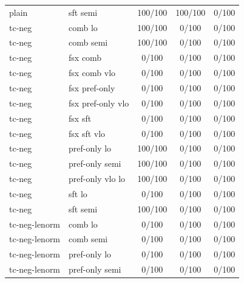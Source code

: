 \documentclass[10pt,landscape]{article}
\begin{document}
\begin{tabular}{llccc}
plain & sft semi & \cellcolor{done}100/100 & \cellcolor{done}100/100 & \cellcolor{missing}0/100 \\
tc-neg & comb lo & \cellcolor{done}100/100 & \cellcolor{missing}0/100 & \cellcolor{missing}0/100 \\
tc-neg & comb semi & \cellcolor{done}100/100 & \cellcolor{missing}0/100 & \cellcolor{missing}0/100 \\
tc-neg & fsx comb & \cellcolor{missing}0/100 & \cellcolor{missing}0/100 & \cellcolor{missing}0/100 \\
tc-neg & fsx comb vlo & \cellcolor{missing}0/100 & \cellcolor{missing}0/100 & \cellcolor{missing}0/100 \\
tc-neg & fsx pref-only & \cellcolor{missing}0/100 & \cellcolor{missing}0/100 & \cellcolor{missing}0/100 \\
tc-neg & fsx pref-only vlo & \cellcolor{missing}0/100 & \cellcolor{missing}0/100 & \cellcolor{missing}0/100 \\
tc-neg & fsx sft & \cellcolor{missing}0/100 & \cellcolor{missing}0/100 & \cellcolor{missing}0/100 \\
tc-neg & fsx sft vlo & \cellcolor{missing}0/100 & \cellcolor{missing}0/100 & \cellcolor{missing}0/100 \\
tc-neg & pref-only lo & \cellcolor{done}100/100 & \cellcolor{missing}0/100 & \cellcolor{missing}0/100 \\
tc-neg & pref-only semi & \cellcolor{done}100/100 & \cellcolor{missing}0/100 & \cellcolor{missing}0/100 \\
tc-neg & pref-only vlo lo & \cellcolor{done}100/100 & \cellcolor{missing}0/100 & \cellcolor{missing}0/100 \\
tc-neg & sft lo & \cellcolor{missing}0/100 & \cellcolor{missing}0/100 & \cellcolor{missing}0/100 \\
tc-neg & sft semi & \cellcolor{done}100/100 & \cellcolor{missing}0/100 & \cellcolor{missing}0/100 \\
tc-neg-lenorm & comb lo & \cellcolor{missing}0/100 & \cellcolor{missing}0/100 & \cellcolor{missing}0/100 \\
tc-neg-lenorm & comb semi & \cellcolor{missing}0/100 & \cellcolor{missing}0/100 & \cellcolor{missing}0/100 \\
tc-neg-lenorm & pref-only lo & \cellcolor{missing}0/100 & \cellcolor{missing}0/100 & \cellcolor{missing}0/100 \\
tc-neg-lenorm & pref-only semi & \cellcolor{missing}0/100 & \cellcolor{missing}0/100 & \cellcolor{missing}0/100 \\

\end{tabular}
\end{document}
